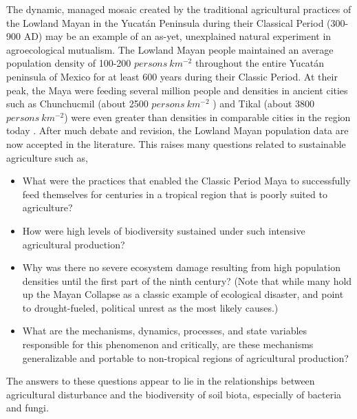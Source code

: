 The dynamic, managed mosaic created by the traditional agricultural practices of the Lowland Mayan in the Yucat\'{a}n Peninsula during their Classical Period (300-900 AD) may be an example of an as-yet, unexplained natural experiment in agroecological mutualism. The Lowland Mayan people maintained an average population density of 100-200 $persons \ km^{-2}$ throughout the entire Yucat\'{a}n peninsula of Mexico for at least 600 years during their Classic Period. At their peak, the Maya were feeding several million people \citep{gomez-pompa_lowland_2003} and densities in ancient cities such as Chunchucmil (about 2500  $persons \ km^{-2}$ ) and Tikal (about 3800 $persons \ km^{-2}$) were even greater than densities in comparable cities in the region today \citep{dahlin_reconstructing_2005, faust_maya_2001}.  After much debate and revision, the Lowland Mayan population data are now accepted in the literature. This raises many questions related to sustainable agriculture such as,
\begin{itemize}
  \item What were the practices that enabled the Classic Period Maya to successfully feed themselves for centuries in a tropical region that is poorly suited to agriculture?
  \item How were high levels of biodiversity sustained under such intensive agricultural production? 
  \item Why was there no severe ecosystem damage resulting from high population densities until the first part of the ninth century? (Note that while many hold up the Mayan Collapse as a classic example of ecological disaster, \citet{gomez-pompa_lowland_2003} and \citet{diamond_collapse:_2006} point to drought-fueled, political unrest as the most likely causes.)
  \item What are the mechanisms, dynamics, processes, and state variables responsible for this phenomenon and critically, are these mechanisms generalizable and portable to non-tropical regions of agricultural production?
\end{itemize}
The answers to these questions appear to lie in the relationships between agricultural disturbance and the biodiversity of soil biota, especially of bacteria and fungi. 

  
